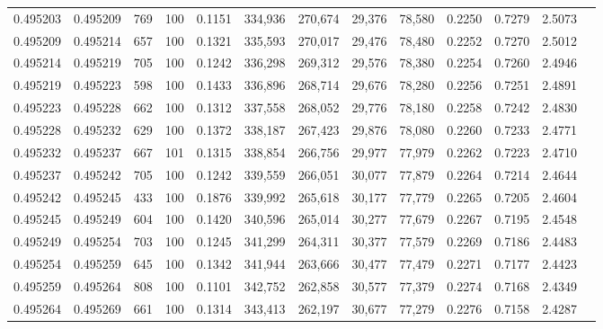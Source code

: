 \begin{tabular}{rrrrrrrrrrrrr}
0.495203 & 0.495209 &   769 & 100 &                                     0.1151 & 334,936 & 270,674 &  29,376 &  78,580 & 0.2250 & 0.7279 & 2.5073 \\
0.495209 & 0.495214 &   657 & 100 &                                     0.1321 & 335,593 & 270,017 &  29,476 &  78,480 & 0.2252 & 0.7270 & 2.5012 \\
0.495214 & 0.495219 &   705 & 100 &                                     0.1242 & 336,298 & 269,312 &  29,576 &  78,380 & 0.2254 & 0.7260 & 2.4946 \\
0.495219 & 0.495223 &   598 & 100 &                                     0.1433 & 336,896 & 268,714 &  29,676 &  78,280 & 0.2256 & 0.7251 & 2.4891 \\
0.495223 & 0.495228 &   662 & 100 &                                     0.1312 & 337,558 & 268,052 &  29,776 &  78,180 & 0.2258 & 0.7242 & 2.4830 \\
0.495228 & 0.495232 &   629 & 100 &                                     0.1372 & 338,187 & 267,423 &  29,876 &  78,080 & 0.2260 & 0.7233 & 2.4771 \\
0.495232 & 0.495237 &   667 & 101 &                                     0.1315 & 338,854 & 266,756 &  29,977 &  77,979 & 0.2262 & 0.7223 & 2.4710 \\
0.495237 & 0.495242 &   705 & 100 &                                     0.1242 & 339,559 & 266,051 &  30,077 &  77,879 & 0.2264 & 0.7214 & 2.4644 \\
0.495242 & 0.495245 &   433 & 100 &                                     0.1876 & 339,992 & 265,618 &  30,177 &  77,779 & 0.2265 & 0.7205 & 2.4604 \\
0.495245 & 0.495249 &   604 & 100 &                                     0.1420 & 340,596 & 265,014 &  30,277 &  77,679 & 0.2267 & 0.7195 & 2.4548 \\
0.495249 & 0.495254 &   703 & 100 &                                     0.1245 & 341,299 & 264,311 &  30,377 &  77,579 & 0.2269 & 0.7186 & 2.4483 \\
0.495254 & 0.495259 &   645 & 100 &                                     0.1342 & 341,944 & 263,666 &  30,477 &  77,479 & 0.2271 & 0.7177 & 2.4423 \\
0.495259 & 0.495264 &   808 & 100 &                                     0.1101 & 342,752 & 262,858 &  30,577 &  77,379 & 0.2274 & 0.7168 & 2.4349 \\
0.495264 & 0.495269 &   661 & 100 &                                     0.1314 & 343,413 & 262,197 &  30,677 &  77,279 & 0.2276 & 0.7158 & 2.4287 \\

\end{tabular}

